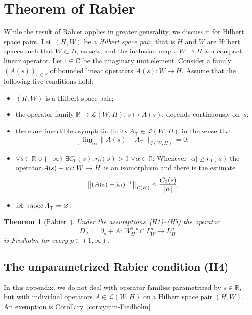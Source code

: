 \documentclass[pdftex]{sigma}
\numberwithin{equation}{section}
\newtheorem{Theorem}{Theorem}[section]
\newcommand{\C}{{\mathbb{C}}}
\newcommand{\R}{{\mathbb{R}}}
\newcommand{\Ll}{{\mathcal{L}}} %
\newcommand{\spec}{\mathrm{spec}\,} %
\newcommand{\norm}{{\rm norm}}
\def\abs#1{\mathopen|#1\mathclose|}
\def\norm#1{\mathopen\|#1\mathclose\|}
\newcommand{\p}{{\partial}}
\newcommand{\1}{{{\mathchoice {\rm 1\mskip-4mu l} {\rm 1\mskip-4mu l}
{\rm 1\mskip-4.5mu l} {\rm 1\mskip-5mu l}}}}
\begin{document}
\appendix

\section{Theorem of Rabier}

While the result of Rabier applies in greater generality,
we discuss it for Hilbert space pairs.
Let~$(H,W)$ be a \textit{Hilbert space pair},
that is $H$ and $W$ are Hilbert spaces
such that $W\subset H$, as sets, and
the inclusion map $\iota\colon W\to H$ is
a compact linear operator.
Let ${\rm i}\in\C$ be the imaginary unit element.
Consider a family $(A(s))_{s\in\R}$
of bounded linear operators $A(s)\colon W\to H$.
Assume that the following five conditions hold:
\begin{itemize}\setlength\itemsep{0ex}
\item[\rm (H1)]
 $(H,W)$ is a Hilbert space pair;
\item[\rm (H2)]
 the operator family $\R\to\Ll(W,H)$, $s\mapsto A(s)$, depends
 continuously on~$s$;
\item[\rm (H3)]
 there are invertible asymptotic limits $A_\mp\in \Ll(W,H)$
 in the sense that
 \[
 \lim_{s\to\mp\infty} \norm{A(s)-A_\mp}_{\Ll(W,H)}=0 ;
 \]
\item[\rm (H4)]
 $\forall s\in\R\cup\{\mp\infty\}$
 $\exists C_0(s),r_0(s)>0$ $\forall \alpha\in\R$:
 Whenever $\abs{\alpha}\ge r_0(s)$ the operator
 $ A(s)-{\rm i}\alpha \colon W\to H$ is an isomorphism and there is the
 estimate
 \[
 \bigl\|(A(s)-{\rm i}\alpha)^{-1}\bigr\|_{\Ll(H)}
 \le \frac{C_0(s)}{\abs{\alpha}} ;
 \]
\item[\rm (H5)]
 ${\rm i}\R\cap\spec A_\mp=\varnothing$.
\end{itemize}

\begin{Theorem}[Rabier~\cite{Rabier:2004a}]\label{thm:Rabier}
Under the assumptions~{\rm (H1)--(H5)} the operator
\[
 D_A:=\p_s+A
 \colon\ W^{1,p}_{H}\cap L^p_{W}\to L^p_H
\]
is Fredholm for every $p\in(1,\infty)$.
\end{Theorem}

\subsection{The unparametrized Rabier condition (H4)}

In this appendix, we do not deal with operator families
parametrized by $s\in\R$, but with
individual operators $A\in\Ll(W,H)$ on a Hilbert space pair $(H,W)$.
An exemption is Corollary~\ref{cor:symm-Fredholm}.
\end{document}
